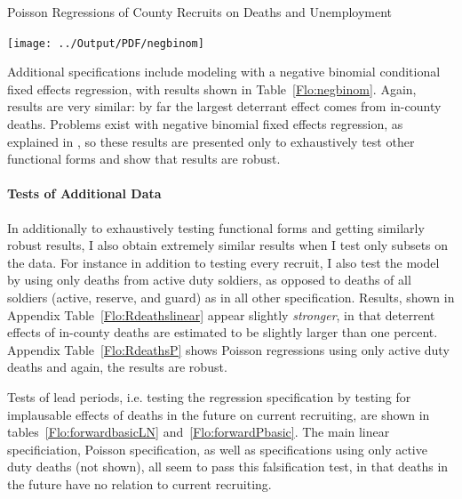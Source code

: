 \documentclass[12pt] {article}
\begin{document}
\pagebreak{}
\begin{table}
\caption{Poisson Regressions of County Recruits on Deaths and Unemployment}
\label{Flo:Poisson Basic}
\scalebox{0.9}{}
\end{table}


\pagebreak{}
\clearpage{}
\begin{table}
\caption{}
\label{Flo:negbinom}
\texttt{[image: ../Output/PDF/negbinom]}
\end{table}

Additional specifications include modeling %
with a negative binomial conditional fixed effects regression, with results shown in Table~\ref{Flo:negbinom}. Again, results are very similar: by far the largest deterrant effect comes from in-county deaths. Problems exist with negative binomial fixed effects regression, as explained in \cite{negbinom}, so these results are presented only to exhaustively test other functional forms and show that results are robust. 

\paragraph{Tests of Additional Data}
In additionally to exhaustively testing functional forms and getting similarly robust results, I also obtain extremely similar results when I test only subsets on the data. For instance 
in addition to testing every recruit, I also test the model by using only deaths from active duty soldiers, as opposed to deaths of all soldiers (active, reserve, and guard) as in all other specification. Results, shown in Appendix Table~\ref{Flo:Rdeathslinear} appear slightly \textit{stronger}, in that deterrent effects of in-county deaths are estimated to be slightly larger than one percent. Appendix Table~\ref{Flo:RdeathsP} shows Poisson regressions using only active duty deaths and again, the results are robust.

Tests of lead periods, i.e. testing the regression specification by testing for implausable effects of deaths in the future on current recruiting, are shown in tables~\ref{Flo:forwardbasicLN} and~\ref{Flo:forwardPbasic}. The main linear specificiation, Poisson specification, as well as specifications using only active duty deaths (not shown), all seem to pass this falsification test, in that deaths in the future have no relation to current recruiting. 
\end{document}
